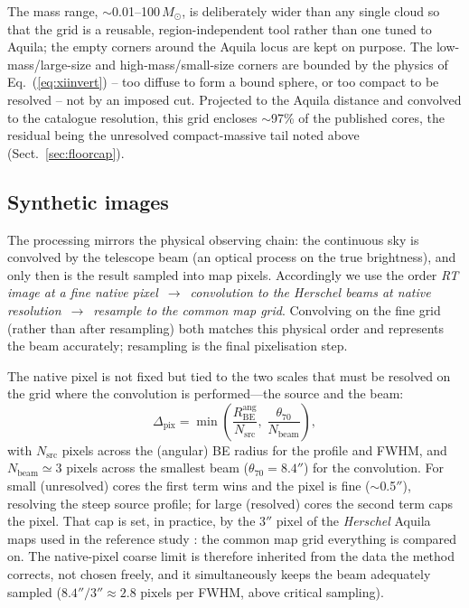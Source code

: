 \documentclass[11pt,a4paper]{article}
\newcommand{\msun}{M_{\odot}}
\newcommand{\Rbe}{R_{\mathrm{BE}}}
\begin{document}
The mass range, $\sim$0.01--100\,$\msun$, is deliberately wider than any single
cloud so that the grid is a reusable, region-independent tool rather than one
tuned to Aquila; the empty corners around the Aquila locus are kept on purpose.
The low-mass/large-size and high-mass/small-size corners are bounded by the
physics of Eq.~(\ref{eq:xiinvert}) -- too diffuse to form a bound sphere, or too
compact to be resolved -- not by an imposed cut. Projected to the Aquila
distance and convolved to the catalogue resolution, this grid encloses
$\sim$97\% of the published cores, the residual being the unresolved
compact-massive tail noted above (Sect.~\ref{sec:floorcap}).

\subsection{Synthetic images}
\label{sec:images}

The processing mirrors the physical observing chain: the continuous sky is
convolved by the telescope beam (an optical process on the true brightness),
and only then is the result sampled into map pixels. Accordingly we use the
order \emph{RT image at a fine native pixel}~$\rightarrow$~\emph{convolution
to the \emph{Herschel} beams at native resolution}~$\rightarrow$~\emph{resample
to the common map grid}. Convolving on the fine grid (rather than after
resampling) both matches this physical order and represents the beam
accurately; resampling is the final pixelisation step.

The native pixel is not fixed but tied to the two scales that must be
resolved on the grid where the convolution is performed---the source and the
beam:
\begin{equation}
  \Delta_{\mathrm{pix}} = \min\!\left(
  \frac{\Rbe^{\mathrm{ang}}}{N_{\mathrm{src}}},\;
  \frac{\theta_{70}}{N_{\mathrm{beam}}}\right),
  \label{eq:pixrule}
\end{equation}
with $N_{\mathrm{src}}$ pixels across the (angular) BE radius for the profile
and FWHM, and $N_{\mathrm{beam}}\simeq 3$ pixels across the smallest beam
($\theta_{70}=8.4''$) for the convolution. For small (unresolved) cores the
first term wins and the pixel is fine ($\sim$0.5$''$), resolving the steep
source profile; for large (resolved) cores the second term caps the pixel.
That cap is set, in practice, by the $3''$ pixel of the \emph{Herschel}
Aquila maps used in the reference study \citep{Konyves+2015}: the common map
grid everything is compared on. The native-pixel coarse limit is therefore
inherited from the data the method corrects, not chosen freely, and it
simultaneously keeps the beam adequately sampled
($8.4''/3'' \approx 2.8$ pixels per FWHM, above critical sampling).
\end{document}
